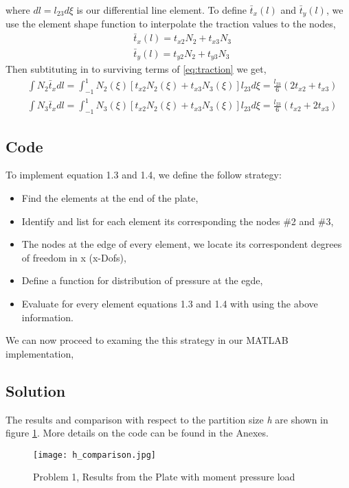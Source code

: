 \documentclass[a4paper]{memoir}
\begin{document}
\label{eq:traction}
where $dl = l_{23}d\xi$ is our differential line element. To define $\bar{t}_x(l)$ and $\bar{t}_y(l)$, we use the element shape function to interpolate the traction values to the nodes,
\begin{align*}
		& \bar{t}_x(l) = t_{x2}N_2 + t_{x3}N_3 \\
		& \bar{t}_y(l) = t_{y2}N_2 + t_{y3}N_3
\end{align*}
Then subtituting in to surviving terms of \ref{eq:traction} we get,
\begin{align}
	& \int N_2\bar{t}_x dl = \int_{-1}^{1} N_2(\xi)[t_{x2}N_2(\xi)+t_{x3}N_3(\xi)]l_{23}d\xi = \frac{l_{23}}{6}(2t_{x2}+t_{x3}) \\
	& \int N_3\bar{t}_x dl = \int_{-1}^{1} N_3(\xi)[t_{x2}N_2(\xi)+t_{x3}N_3(\xi)]l_{23}d\xi = \frac{l_{23}}{6}(t_{x2}+2t_{x3})
\end{align}

\subsection{Code}
To implement equation 1.3 and 1.4, we define the follow strategy:
\begin{itemize}
	\item Find the elements at the end of the plate,
	\item Identify and list for each element its corresponding the nodes \#2 and \#3,
	\item The nodes at the edge of every element, we locate its correspondent degrees of freedom in x (x-Dofs),
	\item Define a function for distribution of pressure at the egde,
	\item Evaluate for every element equations 1.3 and 1.4 with using the above information.
\end{itemize} 
We can now proceed to examing the this strategy in our MATLAB implementation,


\subsection{Solution}
The results and comparison with respect to the partition size \textit{h} are shown in figure \ref{fig:h_comparison}. More details on the code can be found in the Anexes.

\begin{figure}
	\centering
		\texttt{[image: h\_comparison.jpg]}
	\caption{Problem 1, Results from the Plate with moment pressure load}
	\label{fig:h_comparison}
\end{figure}
\end{document}
